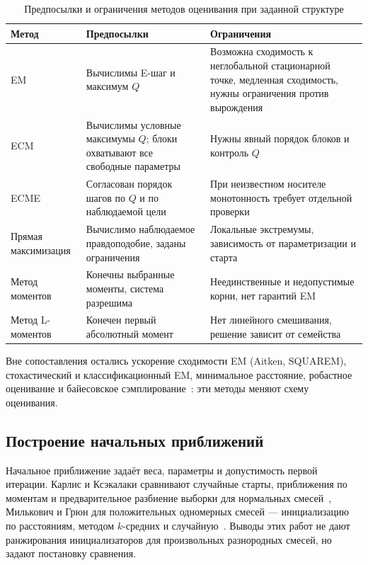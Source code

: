 \begin{table}[!ht]
    \centering
    \small
    \renewcommand{\arraystretch}{1.25}
    \caption{Предпосылки и ограничения методов оценивания при заданной структуре}\label{tab:estimation-methods}
    \begin{tabularx}{\textwidth}{@{}>{\raggedright\arraybackslash}p{}>{\raggedright\arraybackslash}X>{\raggedright\arraybackslash}X@{}}
        \toprule
        \textbf{Метод} & \textbf{Предпосылки} & \textbf{Ограничения}\\
        \midrule
        EM & Вычислимы E-шаг и максимум $Q$ & Возможна сходимость к неглобальной стационарной точке, медленная сходимость, нужны ограничения против вырождения\\
        \addlinespace
        ECM & Вычислимы условные максимумы $Q$; блоки охватывают все свободные параметры & Нужны явный порядок блоков и контроль $Q$\\
        \addlinespace
        ECME & Согласован порядок шагов по $Q$ и по наблюдаемой цели & При неизвестном носителе монотонность требует отдельной проверки\\
        \addlinespace
        Прямая максимизация & Вычислимо наблюдаемое правдоподобие, заданы ограничения & Локальные экстремумы, зависимость от параметризации и старта\\
        \addlinespace
        Метод моментов & Конечны выбранные моменты, система разрешима & Неединственные и недопустимые корни, нет гарантий EM\\
        \addlinespace
        Метод L-моментов & Конечен первый абсолютный момент & Нет линейного смешивания, решение зависит от семейства\\
        \bottomrule
    \end{tabularx}
\end{table}

Вне сопоставления остались ускорение сходимости EM (Aitken, SQUAREM), стохастический и классификационный EM, минимальное расстояние, робастное оценивание и байесовское сэмплирование~\cite{RichardsonGreen1997}: эти методы меняют схему оценивания.

\subsection{Построение начальных приближений}
\label{sec:initialization}

Начальное приближение задаёт веса, параметры и допустимость первой итерации. Карлис и Ксэкалаки сравнивают случайные старты, приближения по моментам и предварительное разбиение выборки для нормальных смесей~\cite{KarlisXekalaki2003}, Милькович и Грюн для положительных одномерных смесей --- инициализацию по расстояниям, методом $k$-средних и случайную~\cite{MiljkovicGrun2016}. Выводы этих работ не дают ранжирования инициализаторов для произвольных разнородных смесей, но задают постановку сравнения.

